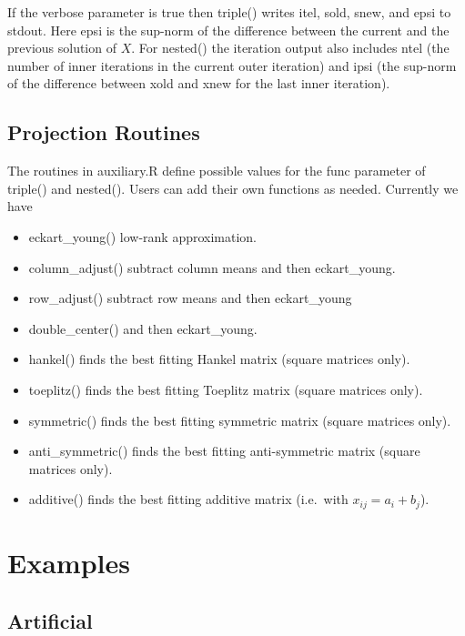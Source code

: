 \documentclass[
  12pt,
  letterpaper,
  DIV=11,
  numbers=noendperiod]{scrartcl}
\providecommand{\tightlist}{%
  \setlength{\itemsep}{0pt}\setlength{\parskip}{0pt}}
\newcommand{\sectionbreak}{\clearpage}
\begin{document}
If the verbose parameter is true then triple() writes itel, sold, snew,
and epsi to stdout. Here epsi is the sup-norm of the difference between
the current and the previous solution of \(X\). For nested() the
iteration output also includes ntel (the number of inner iterations in
the current outer iteration) and ipsi (the sup-norm of the difference
between xold and xnew for the last inner iteration).

\subsection{Projection Routines}\label{projection-routines}

The routines in auxiliary.R define possible values for the func
parameter of triple() and nested(). Users can add their own functions as
needed. Currently we have

\begin{itemize}
\tightlist
\item
  eckart\_young() low-rank approximation.
\item
  column\_adjust() subtract column means and then eckart\_young.
\item
  row\_adjust() subtract row means and then eckart\_young
\item
  double\_center() and then eckart\_young.
\item
  hankel() finds the best fitting Hankel matrix (square matrices only).
\item
  toeplitz() finds the best fitting Toeplitz matrix (square matrices
  only).
\item
  symmetric() finds the best fitting symmetric matrix (square matrices
  only).
\item
  anti\_symmetric() finds the best fitting anti-symmetric matrix (square
  matrices only).
\item
  additive() finds the best fitting additive matrix (i.e.~with
  \(x_{ij}=a_i+b_j\)).
\end{itemize}

\sectionbreak

\section{Examples}\label{examples}

\subsection{Artificial}\label{artificial}
\end{document}
